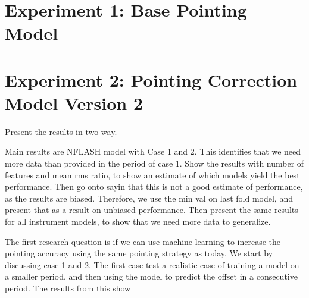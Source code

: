 \section{Experiment 1: Base Pointing Model}
 


\section{Experiment 2: Pointing Correction Model Version 2}

Present the results in two way.

Main results are NFLASH model with Case 1 and 2. This identifies that we need more data than provided in the period of case 1.
Show the results with number of features and mean rms ratio, to show an estimate of which models yield the best performance.
Then go onto sayin that this is not a good estimate of performance, as the results are biased. Therefore, we use the min val on last fold model,
and present that as a result on unbiased performance.
Then present the same results for all instrument models, to show that we need more data to generalize.

The first research question is if we can use machine learning to increase the pointing accuracy using the same pointing strategy as today.
We start by discussing case 1 and 2.
The first case test a realistic case of training a model on a smaller period,
and then using the model to predict the offset in a consecutive period.
The results from this show 




